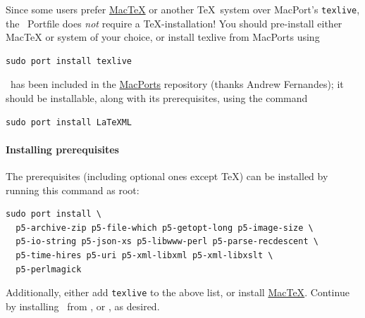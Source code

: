 \documentclass{article}
\begin{document}
Since some users prefer \href{http://tug.org/mactex/}{MacTeX} or another
\TeX\ system over MacPort's \texttt{texlive},
the \LaTeXML\ Portfile does \emph{not} require a \TeX-installation!
You should pre-install either MacTeX or system of your choice,
or install texlive from MacPorts using
\begin{lstlisting}[style=shell]
sudo port install texlive
\end{lstlisting}

\LaTeXML\ has been included in the \href{http://www.macports.org}{MacPorts}
repository (thanks Andrew Fernandes);
it should be installable, along with its prerequisites, using the command
\begin{lstlisting}[style=shell]
sudo port install LaTeXML
\end{lstlisting}

\paragraph{Installing prerequisites}\label{install.mac.prereq}
The prerequisites (including optional ones except \TeX) can be installed by running
this command as root: 
\begin{lstlisting}[style=shell]
sudo port install \
  p5-archive-zip p5-file-which p5-getopt-long p5-image-size \
  p5-io-string p5-json-xs p5-libwww-perl p5-parse-recdescent \
  p5-time-hires p5-uri p5-xml-libxml p5-xml-libxslt \
  p5-perlmagick
\end{lstlisting}
Additionally, either add \texttt{texlive} to the above list,
or install \href{http://tug.org/mactex/}{MacTeX}.
Continue by installing \LaTeXML\ from
, 
or \htmlref{GitHub}{install.github}, as desired.

\end{document}
